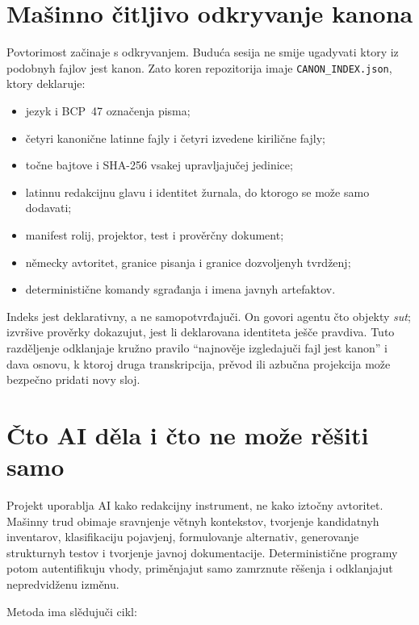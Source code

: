\documentclass[11pt]{article}
\newcommand{\code}[1]{\texttt{#1}}
\begin{document}
\section{Mašinno čitljivo odkryvanje kanona}

Povtorimost začinaje s odkryvanjem. Buduća sesija ne smije ugadyvati ktory iz podobnyh fajlov jest kanon. Zato koren repozitorija imaje \code{CANON\_INDEX.json}, ktory deklaruje:

\begin{itemize}
\item jezyk i BCP~47 označenja pisma;
\item četyri kanonične latinne fajly i četyri izvedene kirilične fajly;
\item točne bajtove i SHA-256 vsakej upravljajučej jedinice;
\item latinnu redakcijnu glavu i identitet žurnala, do ktorogo se može samo dodavati;
\item manifest rolij, projektor, test i prověrčny dokument;
\item německy avtoritet, granice pisanja i granice dozvoljenyh tvrdženj;
\item deterministične komandy sgrađanja i imena javnyh artefaktov.
\end{itemize}

Indeks jest deklarativny, a ne samopotvrđajuči. On govori agentu čto objekty \emph{sut}; izvršive prověrky dokazujut, jest li deklarovana identiteta ješče pravdiva. Tuto razděljenje odklanjaje kružno pravilo ``najnověje izgledajuči fajl jest kanon'' i dava osnovu, k ktoroj druga transkripcija, prěvod ili azbučna projekcija može bezpečno pridati novy sloj.

\section{Čto AI děla i čto ne može rěšiti samo}

Projekt uporablja AI kako redakcijny instrument, ne kako iztočny avtoritet. Mašinny trud obimaje sravnjenje větnyh kontekstov, tvorjenje kandidatnyh inventarov, klasifikaciju pojavjenj, formulovanje alternativ, generovanje strukturnyh testov i tvorjenje javnoj dokumentacije. Deterministične programy potom autentifikuju vhody, priměnjajut samo zamrznute rěšenja i odklanjajut nepredvidženu izměnu.

Metoda ima slědujuči cikl:
\end{document}
